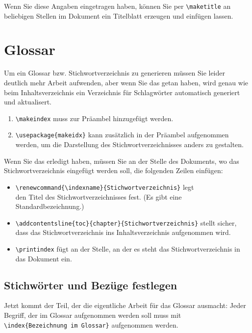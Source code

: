 Wenn Sie diese Angaben eingetragen haben, können Sie per \verb|\maketitle| an beliebigen Stellen im Dokument ein Titelblatt erzeugen und einfügen lassen.

\section{Glossar}

Um ein Glossar bzw. Stichwortverzeichnis zu generieren müssen Sie leider deutlich mehr Arbeit aufwenden, aber wenn Sie das getan haben, wird genau wie beim Inhaltsverzeichnis ein Verzeichnis für Schlagwörter automatisch generiert und aktualisert.\\

\begin{enumerate}
	\item \verb|\makeindex| muss zur Präambel hinzugefügt werden.
	\item \verb|\usepackage{makeidx}| kann zusätzlich in der Präambel aufgenommen werden, um die Darstellung des Stichwortverzeichnisses anders zu gestalten.
\end{enumerate}

Wenn Sie das erledigt haben, müssen Sie an der Stelle des Dokuments, wo das Stichwortverzeichnis eingefügt werden soll, die folgenden Zeilen einfügen:

\begin{itemize}
	\item \verb|\renewcommand{\indexname}{Stichwortverzeichnis}| legt \\den Titel des Stichwortverzeichnisses fest. (Es gibt eine Standardbezeichnung.)
	\item \verb|\addcontentsline{toc}{chapter}{Stichwortverzeichnis}| stellt sicher, dass das Stichwortverzeichnis ins Inhaltsverzeichnis aufgenommen wird.
	\item \verb|\printindex| fügt an der Stelle, an der es steht das Stichwortverzeichnis in das Dokument ein.
\end{itemize}

\subsection{Stichwörter und Bezüge festlegen}

Jetzt kommt der Teil, der die eigentliche Arbeit für das Glossar ausmacht: Jeder Begriff, der im Glossar aufgenommen werden soll muss mit \\\verb|\index{Bezeichnung im Glossar}| aufgenommen werden.\\

